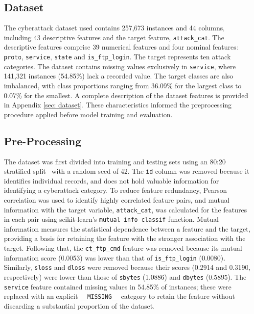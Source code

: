 \documentclass[conference, 10pt]{IEEEtran}
\begin{document}
\subsection{Dataset}
The cyberattack dataset used contains 257,673 instances and 44 columns, including 43 descriptive features and 
the target feature, \texttt{attack\_cat}. The descriptive features comprise 39 numerical features and four nominal 
features: \texttt{proto}, \texttt{service}, \texttt{state} and \texttt{is\_ftp\_login}. The target represents ten 
attack categories. The dataset contains missing values exclusively in \texttt{service}, where 141,321 instances 
(54.85\%) lack a recorded value. The target classes are also imbalanced, with class proportions ranging from 36.09\% 
for the largest class to 0.07\% for the smallest. A complete description of the dataset features is provided in Appendix 
\ref{sec: dataset}. These characteristics informed the preprocessing procedure applied before model training and evaluation.

\subsection{Pre-Processing} 
The dataset was first divided into training and testing sets using an 80:20 stratified split~\cite{DBLP:conf/ijcai/Kohavi95} 
with a random seed of 42. The \texttt{id} column was removed because it identifies individual records, and does not hold 
valuable information for identifying a cyberattack category. To reduce feature redundancy, Pearson correlation was used to 
identify highly correlated feature pairs, and mutual information with the target variable, \texttt{attack\_cat}, was 
calculated for the features in each pair using scikit-learn's \texttt{mutual\_info\_classif} function. Mutual information 
measures the statistical dependence between a feature and the target, providing a basis for retaining the feature with the 
stronger association with the target. Following that, the \texttt{ct\_ftp\_cmd} feature was removed because its mutual 
information score (0.0053) was lower than that of \texttt{is\_ftp\_login} (0.0080). Similarly, \texttt{sloss} and \texttt{dloss} were 
removed because their scores (0.2914 and 0.3190, respectively) were lower than those of \texttt{sbytes} (1.0886) and 
\texttt{dbytes} (0.5895). The \texttt{service} feature contained missing values in 54.85\% of instances; these were 
replaced with an explicit \texttt{\_\_MISSING\_\_} category to retain the feature without discarding a substantial 
proportion of the dataset.
\end{document}

